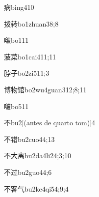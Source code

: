 \begin{verbete}{病}{bing4}{10}
\end{verbete}

\begin{verbete}{拨转}{bo1zhuan3}{8;8}
\end{verbete}

\begin{verbete}{啵}{bo1}{11}
\end{verbete}

\begin{verbete}{菠菜}{bo1cai4}{11;11}
\end{verbete}

\begin{verbete}{脖子}{bo2zi5}{11;3}
\end{verbete}

\begin{verbete}{博物馆}{bo2wu4guan3}{12;8;11}
\end{verbete}

\begin{verbete}{啵}{bo5}{11}
\end{verbete}

\begin{verbete}{不}{bu2}[(antes de quarto tom)]{4}
\end{verbete}

\begin{verbete}{不错}{bu2cuo4}{4;13}
\end{verbete}

\begin{verbete}{不大离}{bu2da4li2}{4;3;10}
\end{verbete}

\begin{verbete}{不过}{bu2guo4}{4;6}
\end{verbete}

\begin{verbete}{不客气}{bu2ke4qi5}{4;9;4}
\end{verbete}

